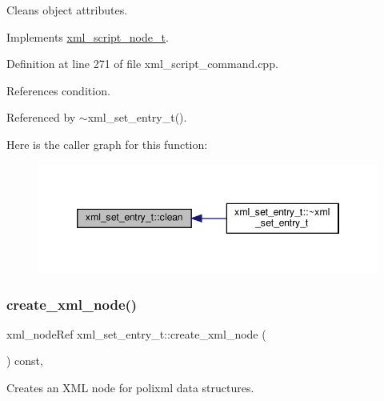 Cleans object attributes. 



Implements \hyperlink{classxml__script__node__t_a2be778f2caef531c55b36c2bf2c996e2}{xml\+\_\+script\+\_\+node\+\_\+t}.



Definition at line 271 of file xml\+\_\+script\+\_\+command.\+cpp.



References condition.



Referenced by $\sim$xml\+\_\+set\+\_\+entry\+\_\+t().

Here is the caller graph for this function\+:
\nopagebreak
\begin{figure}[H]
\begin{center}
\leavevmode
\includegraphics[width=346pt]{d1/d5b/classxml__set__entry__t_ac996d3a7900d2deceeee5efcea48bb3a_icgraph}
\end{center}
\end{figure}
\mbox{\label{classxml__set__entry__t_ac1b86d13e93d6fb01ace81a603cede2a}} 
\subsubsection{\texorpdfstring{create\+\_\+xml\+\_\+node()}{create\_xml\_node()}}
{\footnotesize\ttfamily xml\+\_\+node\+Ref xml\+\_\+set\+\_\+entry\+\_\+t\+::create\+\_\+xml\+\_\+node (\begin{DoxyParamCaption}{ }\end{DoxyParamCaption}) const\hspace{0.3cm}{\ttfamily [override]}, {\ttfamily [virtual]}}



Creates an X\+ML node for polixml data structures. 



